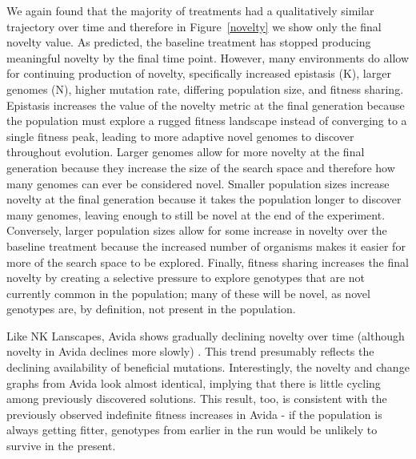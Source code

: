 \documentclass[letterpaper]{article}
\begin{document}
We again found that the majority of treatments had a qualitatively similar trajectory over time and therefore in Figure~\ref{novelty} we show only the final novelty value. As predicted, the baseline treatment has stopped producing meaningful novelty by the final time point. However, many environments do allow for continuing production of novelty, specifically increased epistasis (K), larger genomes (N), higher mutation rate, differing population size, and fitness sharing. Epistasis increases the value of the novelty metric at the final generation because the population must explore a rugged fitness landscape instead of converging to a single fitness peak, leading to more adaptive novel genomes to discover throughout evolution. Larger genomes allow for more novelty at the final generation because they increase the size of the search space and therefore how many genomes can ever be considered novel. Smaller population sizes increase novelty at the final generation because it takes the population longer to discover many genomes, leaving enough to still be novel at the end of the experiment. Conversely, larger population sizes allow for some increase in novelty over the baseline treatment because the increased number of organisms makes it easier for more of the search space to be explored. Finally, fitness sharing increases the final novelty by creating a selective pressure to explore genotypes that are not currently common in the population; many of these will be novel, as novel genotypes are, by definition, not present in the population.

Like NK Lanscapes, Avida shows gradually declining novelty over time (although novelty in Avida declines more slowly) \citep{emily_dolson_2018_1442906}. This trend presumably reflects the declining availability of beneficial mutations. Interestingly, the novelty and change graphs from Avida look almost identical, implying that there is little cycling among previously discovered solutions. This result, too, is consistent with the previously observed indefinite fitness increases in Avida \citep{wiser_analysis_2015} - if the population is always getting fitter, genotypes from earlier in the run would be unlikely to survive in the present.
\end{document}
